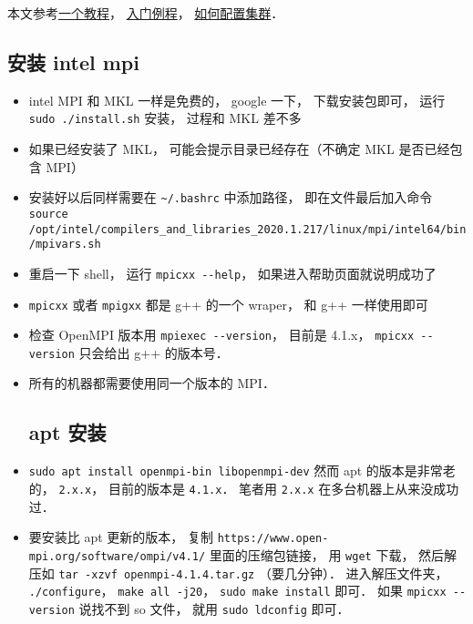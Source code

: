 
\begin{issues}
\issueDraft
\end{issues}

本文参考\href{https://www.codingame.com/playgrounds/349/introduction-to-mpi/introduction-to-distributed-computing}{一个教程}， \href{https://people.sc.fsu.edu/~jburkardt/cpp_src/hello_mpi/hello_mpi.html}{入门例程}， \href{https://mpitutorial.com/tutorials/running-an-mpi-cluster-within-a-lan/}{如何配置集群}．

\subsection{安装 intel mpi}
\begin{itemize}
\item intel MPI 和 MKL 一样是免费的， google 一下， 下载安装包即可， 运行 \verb`sudo ./install.sh` 安装， 过程和 MKL 差不多
\item 如果已经安装了 MKL， 可能会提示目录已经存在（不确定 MKL 是否已经包含 MPI）
\item 安装好以后同样需要在 \verb`~/.bashrc` 中添加路径， 即在文件最后加入命令 \verb`source /opt/intel/compilers_and_libraries_2020.1.217/linux/mpi/intel64/bin/mpivars.sh`
\item 重启一下 shell， 运行 \verb`mpicxx --help`， 如果进入帮助页面就说明成功了
\item \verb`mpicxx` 或者 \verb`mpigxx` 都是 g++ 的一个 wraper， 和 g++ 一样使用即可
\item 检查 OpenMPI 版本用 \verb|mpiexec --version|， 目前是 4.1.x， \verb|mpicxx --version| 只会给出 g++ 的版本号．
\item 所有的机器都需要使用同一个版本的 MPI．

\subsection{apt 安装}
\item \verb|sudo apt install openmpi-bin libopenmpi-dev| 然而 apt 的版本是非常老的， \verb|2.x.x|， 目前的版本是 \verb|4.1.x|． 笔者用 \verb|2.x.x| 在多台机器上从来没成功过．
\item 要安装比 apt 更新的版本， 复制 \verb|https://www.open-mpi.org/software/ompi/v4.1/| 里面的压缩包链接， 用 \verb|wget| 下载， 然后解压如 \verb|tar -xzvf openmpi-4.1.4.tar.gz| （要几分钟）． 进入解压文件夹， \verb|./configure|， \verb|make all -j20|， \verb|sudo make install| 即可． 如果 \verb|mpicxx --version| 说找不到 so 文件， 就用 \verb|sudo ldconfig| 即可．
\end{itemize}

